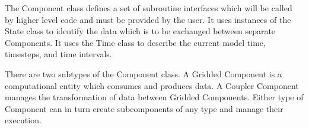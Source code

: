 %


The Component class defines a set of subroutine interfaces which
will be called by higher level code and must be provided by the user.
It uses instances of the State class to identify the data which is
to be exchanged between separate Components.  It uses the Time class
to describe the current model time, timesteps, and time intervals.


There are two subtypes of the Component class. 
A Gridded Component is a computational entity which
consumes and produces data.  A Coupler Component manages the
transformation of data between Gridded Components.  
Either type of
Component can in turn create subcomponents of any type and
manage their execution.


